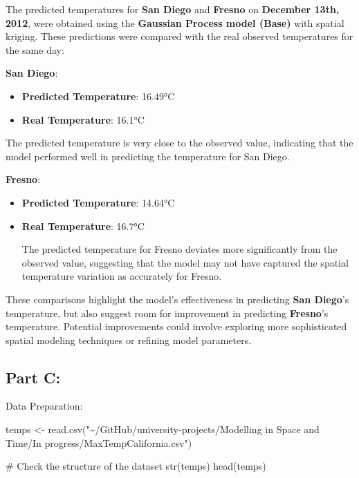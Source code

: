 \documentclass[
  11pt,
]{article}
\newenvironment{Shaded}{\begin{snugshade}}{\end{snugshade}}
\newcommand{\CommentTok}[1]{\textcolor[rgb]{0.37,0.37,0.37}{#1}}
\newcommand{\FunctionTok}[1]{\textcolor[rgb]{0.28,0.35,0.67}{#1}}
\newcommand{\NormalTok}[1]{\textcolor[rgb]{0.00,0.23,0.31}{#1}}
\newcommand{\OtherTok}[1]{\textcolor[rgb]{0.00,0.23,0.31}{#1}}
\newcommand{\StringTok}[1]{\textcolor[rgb]{0.13,0.47,0.30}{#1}}
\begin{document}
The predicted temperatures for \textbf{San Diego} and \textbf{Fresno} on
\textbf{December 13th, 2012}, were obtained using the \textbf{Gaussian
Process model (Base)} with spatial kriging. These predictions were
compared with the real observed temperatures for the same day:

\textbf{San Diego}:

\begin{itemize}
\item
  \textbf{Predicted Temperature}: 16.49°C
\item
  \textbf{Real Temperature}: 16.1°C
\end{itemize}

The predicted temperature is very close to the observed value,
indicating that the model performed well in predicting the temperature
for San Diego.

\textbf{Fresno}:

\begin{itemize}
\item
  \textbf{Predicted Temperature}: 14.64°C
\item
  \textbf{Real Temperature}: 16.7°C

  The predicted temperature for Fresno deviates more significantly from
  the observed value, suggesting that the model may not have captured
  the spatial temperature variation as accurately for Fresno.
\end{itemize}

These comparisons highlight the model's effectiveness in predicting
\textbf{San Diego}'s temperature, but also suggest room for improvement
in predicting \textbf{Fresno}'s temperature. Potential improvements
could involve exploring more sophisticated spatial modeling techniques
or refining model parameters.

\subsection{Part C:}\label{part-c}

Data Preparation:

\begin{Shaded}
\begin{Highlighting}[]
\NormalTok{temps }\OtherTok{\textless{}{-}} \FunctionTok{read.csv}\NormalTok{(}\StringTok{"\textasciitilde{}/GitHub/university{-}projects/Modelling in Space and Time/In progress/MaxTempCalifornia.csv"}\NormalTok{)}

\CommentTok{\# Check the structure of the dataset}
\FunctionTok{str}\NormalTok{(temps)}
\FunctionTok{head}\NormalTok{(temps)}
\end{Highlighting}
\end{Shaded}
\end{document}
